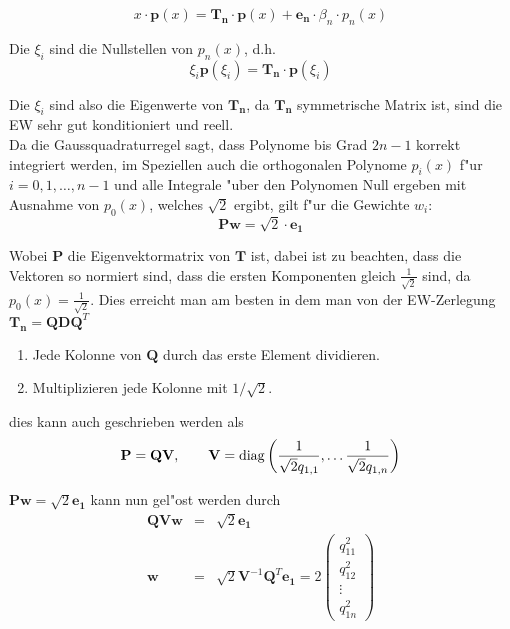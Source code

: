 \documentclass[german, 10pt, a4paper, twocolumn]{scrartcl}
\theoremstyle{definition}
\begin{document}
\begin{displaymath}
	x \cdotp \mathbf{p}(x) = \mathbf{T_n} \cdotp \mathbf{p}(x) + \mathbf{e_n} \cdotp \beta_n \cdotp p_n(x)
\end{displaymath}

Die $\xi_i$ sind die Nullstellen von $p_n(x)$, d.h.
\begin{displaymath}
	\xi_i \mathbf{p}(\xi_i) = \mathbf{T_n}\cdotp \mathbf{p}(\xi_i)
\end{displaymath}

Die $\xi_i$ sind also die Eigenwerte von $\mathbf{T_n}$, da $\mathbf{T_n}$ symmetrische Matrix ist, sind die EW sehr gut konditioniert und reell.\\


Da die Gaussquadraturregel sagt, dass Polynome bis Grad $2n-1$ korrekt integriert werden, im Speziellen auch die orthogonalen Polynome $p_i(x)$ f"ur $i=0,1,\ldots,n-1$ und alle Integrale "uber den Polynomen Null ergeben mit Ausnahme von $p_0(x)$, welches $\sqrt{2}$ ergibt, gilt f"ur die Gewichte $w_i$:
\begin{displaymath}
	\mathbf{P} \mathbf{w} = \sqrt{2}\cdotp \mathbf{e_1}
\end{displaymath}

Wobei $\mathbf{P}$ die Eigenvektormatrix von $\mathbf{T}$ ist, dabei ist zu beachten, dass die Vektoren so normiert sind, dass die ersten Komponenten gleich $\frac{1}{\sqrt{2}}$ sind, da $p_0(x)=\frac{1}{\sqrt{2}}$. Dies erreicht man am besten in dem man von der EW-Zerlegung $\mathbf{T_n} = \mathbf{Q}\mathbf{D}\mathbf{Q}^T$
\begin{enumerate}
	\item Jede Kolonne von $\mathbf{Q}$ durch das erste Element dividieren.
	\item Multiplizieren jede Kolonne mit $1/\sqrt{2}$.
\end{enumerate}
dies kann auch geschrieben werden als
\begin{displaymath}
	\mathbf{P} = \mathbf{Q} \mathbf{V}, \qquad \mathbf{V} = \mathop{\rm diag} \left( \frac{1}{\sqrt{2}q_{1,1}}, \ldots \frac{1}{\sqrt{2}q_{1,n}} \right )
\end{displaymath}

$\mathbf{P}\mathbf{w} = \sqrt{2}\mathbf{e_1}$ kann nun gel"ost werden durch 
\begin{eqnarray*}
	\mathbf{Q}\mathbf{V}\mathbf{w} &	= &	\sqrt{2}\mathbf{e_1} \\
	\mathbf{w} &				= &	\sqrt{2}\mathbf{V}^{-1}\mathbf{Q}^T \mathbf{e_1} = 2 \left (
	\begin{array}{c}
		q_{11}^2\\
		q_{12}^2\\
		\vdots\\
		q_{1n}^2
	\end{array}
	\right )
\end{eqnarray*}
\end{document}
